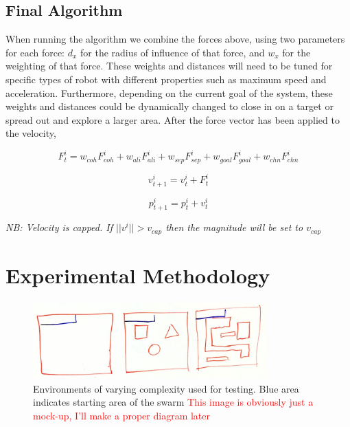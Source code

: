 \documentclass[runningheads]{llncs}
\newcommand\incomplete[1]{\textcolor{red}{#1}}
\begin{document}
\subsection{Final Algorithm}
When running the algorithm we combine the forces above, using two parameters for each force: $d_x$ for the radius of influence of that force, and $w_x$ for the weighting of that force. These weights and distances will need to be tuned for specific types of robot with different properties such as maximum speed and acceleration. Furthermore, depending on the current goal of the system, these weights and distances could be dynamically changed to close in on a target or spread out and explore a larger area. After the force vector has been applied to the velocity, 

\begin{equation}
    F^i_t = w_{coh}F^i_{coh} + w_{ali}F^i_{ali} + w_{sep}F^i_{sep} + w_{goal}F^i_{goal} + w_{chn}F^i_{chn}
\end{equation}

\begin{multicols}{2}
    \begin{equation}
        v^i_{t+1} = v^i_t + F^i_t
    \end{equation}

    \begin{equation}
        p^i_{t+1} = p^i_t + v^i_t
    \end{equation}
\end{multicols}

\textit{\small{NB: Velocity is capped. If $||v^i|| > v_{cap}$ then the magnitude will be set to $v_{cap}$}}


\section{Experimental Methodology}
\begin{figure}[h]
    \centering
    \includegraphics[width=0.8\textwidth]{Images/Example Environments.jpg}
    \caption{Environments of varying complexity used for testing. Blue area indicates starting area of the swarm \incomplete{This image is obviously just a mock-up, I'll make a proper diagram later}}
    \label{fig:example environments}
    \end{figure}
\end{document}
